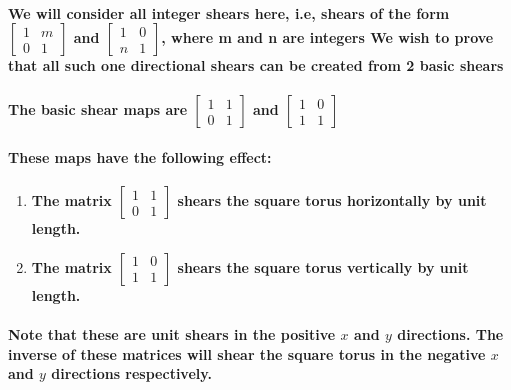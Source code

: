 \documentclass{report}
\begin{document}
\paragraph{We will consider all integer shears here, i.e, shears of the form 
$\begin{bmatrix}
1&m\\0&1
\end{bmatrix}$
and
$\begin{bmatrix}
1&0\\n&1
\end{bmatrix}$,
where m and n are integers
We wish to prove that all such one directional shears can be created from 2 basic shears}


\paragraph{The basic shear maps are 
$\begin{bmatrix}
1&1\\0&1
\end{bmatrix}$
and
$\begin{bmatrix}
1&0\\1&1
\end{bmatrix}$
}

\paragraph{These maps have the following effect:}

\begin{enumerate}
\item \textbf{The matrix
$\begin{bmatrix}
1&1\\0&1
\end{bmatrix}$
shears the square torus 
horizontally by unit length.
}

\item \textbf{The matrix
$\begin{bmatrix}
1&0\\1&1
\end{bmatrix}$
shears the square torus vertically 
by unit length.
}
\end{enumerate}

\paragraph{Note that these are unit shears in the positive $x$ and $y$ directions. The inverse of these matrices will shear the square torus in the negative $x$ and $y$ directions respectively.}
\end{document}
